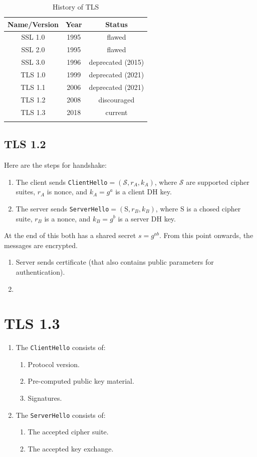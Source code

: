 \documentclass[a4paper, 12pt]{book} %
\begin{document}
\begin{longtable}{|c|c|c|}\hline 
    Name/Version & Year & Status \\ \hline
    SSL 1.0 & 1995 & flawed \\ \hline
    SSL 2.0 & 1995 & flawed \\ \hline 
    SSL 3.0 & 1996 & deprecated  (2015) \\ \hline 
    TLS 1.0 & 1999 & deprecated (2021) \\ \hline 
    TLS 1.1 & 2006 & deprecated (2021) \\ \hline 
    TLS 1.2 & 2008 & discouraged \\ \hline 
    TLS 1.3 & 2018 & current \\ \hline 
    \caption{History of TLS}
\end{longtable}

\section{TLS 1.2}
Here are the steps for handshake: 
\begin{enumerate}
    \item The client sends \verb|ClientHello|$= (\mathscr{S}, r_A, k_A)$, where $\mathscr{S}$ are supported cipher suites, $r_A$ is nonce, and $k_A = g^a$ is a client DH key.
    \item The server sends \verb|ServerHello|$= (\mathrm{S}, r_B, k_B)$, where $\mathrm{S}$ is a chosed cipher suite, $r_B$ is a nonce, and $k_B = g^b$ is a server DH key.
\end{enumerate}
At the end of this both has a shared secret $s = g^{ab}$. From this point onwards, the messages are encrypted.
\begin{enumerate}
    \item Server sends certificate (that also contains public parameters for authentication).
    \item 
\end{enumerate}


\chapter{TLS 1.3}

\begin{enumerate}
    \item The \verb|ClientHello| consists of:
    \begin{enumerate}
        \item Protocol version.
        \item Pre-computed public key material.
        \item Signatures.
    \end{enumerate}
    \item The \verb|ServerHello| consists of:
    \begin{enumerate}
        \item The accepted cipher suite.
        \item The accepted key exchange.
    \end{enumerate}
\end{enumerate}
\end{document}

